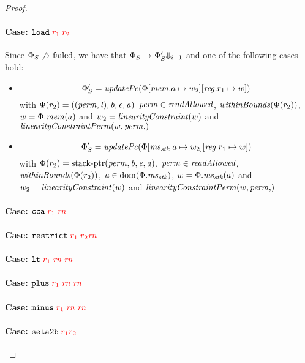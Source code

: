 \documentclass[a4paper]{article}
\begin{document}
\begin{proof}
\paragraph{Case: $\protect\tload{\trg{r_1}}{\trg{r_2}}$}
Since $\Phi_S\not\step\failed$, we have that $\Phi_S \step \Phi_S' \term[i-1]$ and one of the following cases hold: 
\begin{itemize}
\item \[\Phi_S' = \updPcAddr{\Phi\update{\mem.a}{w_2}\updReg{r_1}{w}}\]
  with $\Phi(r_2) = ((\perm,\lin),\baddr,\eaddr,\aaddr)$ 
  $\perm \in \readAllowed{}$, $\withinBounds{\Phi(r_2)}$, $w = \Phi.\mem(a)$ and $w_2 = \linCons{w}$ and $\linConsPerm{w,\perm}$
\item \[\Phi_S' = \updPcAddr{\Phi \update{\ms_\stk.a}{w_2}\updReg{r_1}{w}}\]
  with $\Phi(r_2) = \stkptr{\perm,\baddr,\eaddr,\aaddr}$, $\perm \in \readAllowed{}$, $\withinBounds{\Phi(r_2)}$, $\aaddr \in \dom(\Phi.\ms_\stk)$, $w = \Phi.\ms_\stk(a)$ and $w_2 = \linCons{w}$ and $\linConsPerm{w,\perm}$
\end{itemize}

\paragraph{Case: $\protect\tcca{\trg{r_1}}{\trg{\rn}}$}

\paragraph{Case: $\protect\trestrict{\trg{r_1}}{\trg{r_2}}{\trg{\rn}}$}

\paragraph{Case: $\protect\tlt{\trg{r_1}}{\trg{\rn}}{\trg{\rn}}$}

\paragraph{Case: $\protect\tplus{\trg{r_1}}{\trg{\rn}}{\trg{\rn}}$}

\paragraph{Case: $\protect\tminus{\trg{r_1}}{\trg{\rn}}{\trg{\rn}}$}

\paragraph{Case: $\protect\tsetatob{\trg{r_1}}{\trg{r_2}}$}


\end{proof}
\end{document}
